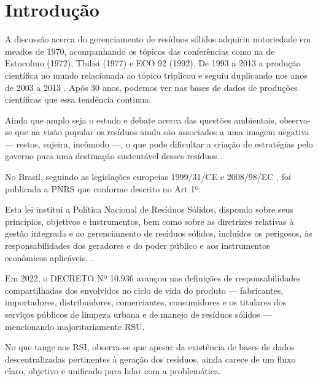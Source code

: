 \chapter{Introdução}

A discussão acerca do gerenciamento de resíduos sólidos adquiriu notoriedade em meados de 1970, acompanhando os tópicos das conferências como na de Estocolmo (1972), Tbilisi (1977) e ECO 92 (1992). De 1993 a 2013 a produção científica no mundo relacionada ao tópico triplicou e seguiu duplicando nos anos de 2003 a 2013 \cite{deus_residuos_2015}. Após 30 anos, podemos ver nas bases de dados de produções científicas que essa tendência continua.

Ainda que amplo seja o estudo e debate acerca das questões ambientais, observa-se que na visão popular os resíduos ainda são associados a uma imagem negativa — restos, sujeira, incômodo —, o que pode dificultar a criação de estratégias pelo governo para uma destinação sustentável desses resíduos \cite{santiago_gestao_2016}.

No Brasil, seguindo as legislações europeias 1999/31/CE \cite{noauthor_directiva_1999} e 2008/98/EC \cite{noauthor_directive_2018}, foi publicada a \gls{PNRS} que conforme descrito no Art 1º:

\begin{citacao}
	Esta lei institui a Política Nacional de Resíduos Sólidos, dispondo sobre seus princípios, objetivos e instrumentos, bem como sobre as diretrizes relativas à gestão integrada e ao gerenciamento de resíduos sólidos, incluídos os perigosos, às responsabilidades dos geradores e do poder público e aos instrumentos econômicos aplicáveis. \cite[Art. 1º]{brasil_lei_nodate}.
\end{citacao}

Em 2022, o DECRETO Nº 10.936 \cite{brasil_decreto_2022} avançou nas definições de responsabilidades compartilhadas dos envolvidos no ciclo de vida do produto — fabricantes, importadores, distribuidores, comerciantes, consumidores e os titulares dos serviços públicos de limpeza urbana e de manejo de resíduos sólidos — mencionando majoritariamente \gls{RSU}.

No que tange aos \gls{RSI}, observa-se que apesar da existência de bases de dados descentralizadas pertinentes à geração dos resíduos, ainda carece de um fluxo claro, objetivo e unificado para lidar com a problemática.

